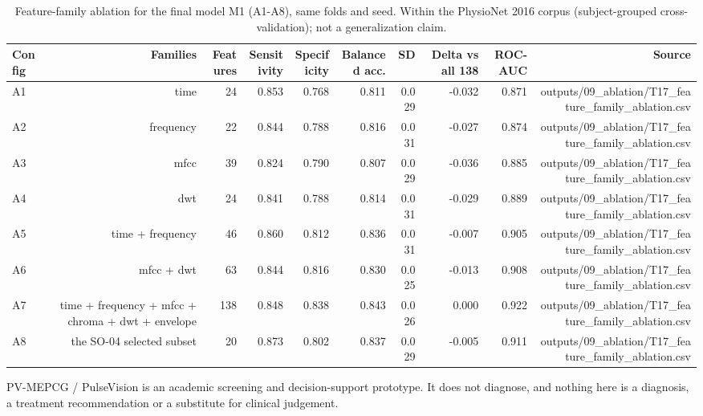 \begin{table}[htbp]
  \centering
  \caption{Feature-family ablation for the final model M1 (A1-A8), same folds and seed. Within the PhysioNet 2016 corpus (subject-grouped cross-validation); not a generalization claim.}
  \label{tab:q1_t05}
  \begin{tabular}{lrrrrrrrrr}
    \toprule
    Config & Families & Features & Sensitivity & Specificity & Balanced acc. & SD & Delta vs all 138 & ROC-AUC & Source \\
    \midrule
    A1 & time & 24 & 0.853 & 0.768 & 0.811 & 0.029 & -0.032 & 0.871 & outputs/09\_ablation/T17\_feature\_family\_ablation.csv \\
    A2 & frequency & 22 & 0.844 & 0.788 & 0.816 & 0.031 & -0.027 & 0.874 & outputs/09\_ablation/T17\_feature\_family\_ablation.csv \\
    A3 & mfcc & 39 & 0.824 & 0.790 & 0.807 & 0.029 & -0.036 & 0.885 & outputs/09\_ablation/T17\_feature\_family\_ablation.csv \\
    A4 & dwt & 24 & 0.841 & 0.788 & 0.814 & 0.031 & -0.029 & 0.889 & outputs/09\_ablation/T17\_feature\_family\_ablation.csv \\
    A5 & time + frequency & 46 & 0.860 & 0.812 & 0.836 & 0.031 & -0.007 & 0.905 & outputs/09\_ablation/T17\_feature\_family\_ablation.csv \\
    A6 & mfcc + dwt & 63 & 0.844 & 0.816 & 0.830 & 0.025 & -0.013 & 0.908 & outputs/09\_ablation/T17\_feature\_family\_ablation.csv \\
    A7 & time + frequency + mfcc + chroma + dwt + envelope & 138 & 0.848 & 0.838 & 0.843 & 0.026 & 0.000 & 0.922 & outputs/09\_ablation/T17\_feature\_family\_ablation.csv \\
    A8 & the SO-04 selected subset & 20 & 0.873 & 0.802 & 0.837 & 0.029 & -0.005 & 0.911 & outputs/09\_ablation/T17\_feature\_family\_ablation.csv \\
    \bottomrule
  \end{tabular}
  \par\footnotesize PV-MEPCG / PulseVision is an academic screening and decision-support prototype. It does not diagnose, and nothing here is a diagnosis, a treatment recommendation or a substitute for clinical judgement.
\end{table}
